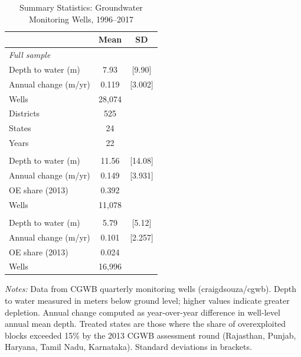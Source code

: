 \begin{table}[htbp]
\centering
\caption{Summary Statistics: Groundwater Monitoring Wells, 1996--2017}
\label{tab:summary}
\begin{threeparttable}
\begin{tabular}{lcc}
\toprule
& Mean & SD \\
\midrule
\multicolumn{3}{l}{\textit{Full sample}} \\
\quad Depth to water (m) & 7.93 & [9.90] \\
\quad Annual change (m/yr) & 0.119 & [3.002] \\
\quad Wells & 28,074 &  \\
\quad Districts & 525 &  \\
\quad States & 24 &  \\
\quad Years & 22 &  \\
\addlinespace
\multicolumn{3}{l}{\textit{Treated states}} \\
\quad Depth to water (m) & 11.56 & [14.08] \\
\quad Annual change (m/yr) & 0.149 & [3.931] \\
\quad OE share (2013) & 0.392 &  \\
\quad Wells & 11,078 &  \\
\addlinespace
\multicolumn{3}{l}{\textit{Control states}} \\
\quad Depth to water (m) & 5.79 & [5.12] \\
\quad Annual change (m/yr) & 0.101 & [2.257] \\
\quad OE share (2013) & 0.024 &  \\
\quad Wells & 16,996 &  \\
\bottomrule
\end{tabular}
\begin{tablenotes}[flushleft]
\small
\item \textit{Notes:} Data from CGWB quarterly monitoring wells (craigdsouza/cgwb).
Depth to water measured in meters below ground level; higher values indicate
greater depletion. Annual change computed as year-over-year difference in
well-level annual mean depth. Treated states are those where the share of
overexploited blocks exceeded 15\% by the 2013 CGWB assessment round
(Rajasthan, Punjab, Haryana, Tamil Nadu, Karnataka). Standard deviations
in brackets.
\end{tablenotes}
\end{threeparttable}
\end{table}

